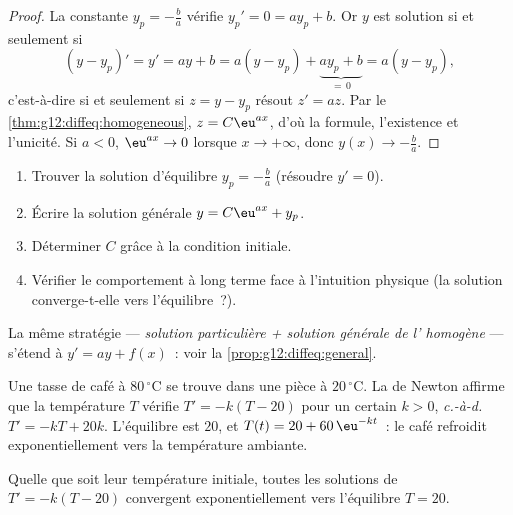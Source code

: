 \begin{proof}
La constante $y_p = -\frac{b}{a}$ vérifie $y_p' = 0 = a y_p + b$. Or $y$ est
solution si et seulement si
\[
(y - y_p)' = y' = ay + b = a(y - y_p) + \underbrace{a y_p + b}_{=\,0}
= a (y - y_p),
\]
c'est-à-dire si et seulement si $z = y - y_p$ résout $z' = az$. Par le
\cref{thm:g12:diffeq:homogeneous}, $z = C\eu^{ax}$, d'où la formule,
l'existence et l'unicité. Si $a < 0$, $\eu^{ax} \to 0$ lorsque
$x \to +\infty$, donc $y(x) \to -\frac ba$.
\end{proof}

\begin{method}[Résoudre $y' = ay + b$ avec condition initiale]\label{met:g12:diffeq:solve}
\begin{enumerate}
  \item Trouver la solution d'équilibre $y_p = -\frac{b}{a}$ (résoudre
        $y' = 0$).
  \item Écrire la solution générale $y = C\eu^{ax} + y_p$.
  \item Déterminer $C$ grâce à la condition initiale.
  \item Vérifier le comportement à long terme face à l'intuition physique
        (la solution converge-t-elle vers l'équilibre~?).
\end{enumerate}
La même stratégie --- \emph{solution particulière + solution générale de
l' homogène} --- s'étend à $y' = ay + f(x)$~: voir la
\cref{prop:g12:diffeq:general}.
\end{method}

\begin{example}\label{ex:g12:diffeq:cooling}
Une tasse de café à $80\,^\circ$C se trouve dans une pièce à $20\,^\circ$C. La 
de Newton affirme que la température $T$ vérifie $T' = -k(T - 20)$ pour un
certain $k > 0$, \emph{c.-à-d.} $T' = -kT + 20k$. L'équilibre est $20$, et
$T(t) = 20 + 60\,\eu^{-kt}$~: le café refroidit exponentiellement vers la
température ambiante.
\end{example}

\begin{omfigure}

{\small Quelle que soit leur température initiale, toutes les solutions de
$T' = -k(T - 20)$ convergent exponentiellement vers l'équilibre $T = 20$.}
\end{omfigure}

